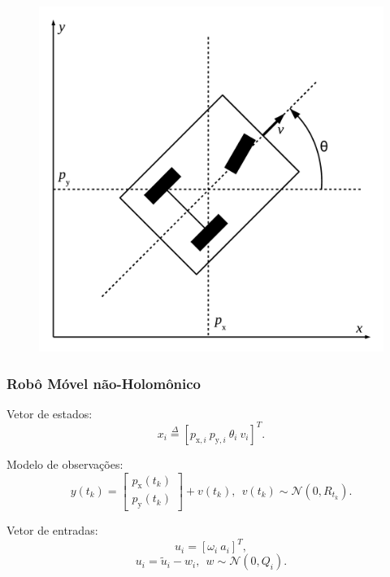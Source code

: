 \documentclass{beamer}
\renewcommand{\(}{\left(}
\renewcommand{\)}{\right)}
\renewcommand{\[}{\left[}
\renewcommand{\]}{\right]}
\begin{document}
\begin{frame}
\begin{minipage}{.70\textwidth}
	\end{minipage}%
	\begin{minipage}{.3\textwidth}
	\begin{figure}
		\centering
		\includegraphics[width=1\textwidth]{images/Nonholomonic-robot.pdf}
	\end{figure}
\end{minipage}



\end{frame}



\begin{frame}
	\frametitle{Robô Móvel não-Holomônico}
	
	Vetor de estados:
	\begin{equation*}
	x_i \overset{\Delta}{=} [p_{\textrm{x},i}\ p_{\textrm{y},i}\ \theta_i\ v_i]^T.
	\end{equation*}
	
	\vspace{0.25cm}
	Modelo de observações:
	\begin{equation*}
	y(t_k) = 
	\begin{bmatrix}
	p_{\textrm{x}}(t_k) \\
	p_{\textrm{y}}(t_k)
	\end{bmatrix}+v(t_k), \  \ v(t_k) \sim \mathcal{N} (0,R_{t_k}).
	\end{equation*}

	
	\vspace{0.25cm}
	Vetor de entradas:
	\begin{equation*}
	u_i = [\omega_i\ a_i]^T,
	\end{equation*}
	\begin{equation*}
	u_i = \tilde{u}_i - w_i, \ \ w \sim \mathcal{N} (0, Q_i).
	\end{equation*}


\end{frame}
\end{document}
